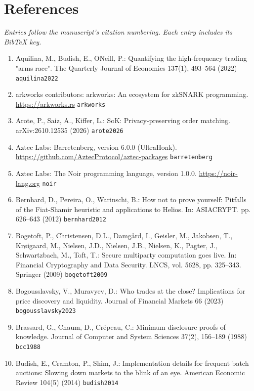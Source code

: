 
\section{References}

\emph{Entries follow the manuscript's citation numbering. Each entry includes its BibTeX key.}

\begin{enumerate}
\def\labelenumi{\arabic{enumi}.}
\item
  Aquilina, M., Budish, E., O\textquotesingle Neill, P.: Quantifying the high-frequency trading "arms race". The Quarterly Journal of Economics 137(1), 493--564 (2022) \texttt{aquilina2022}
\item
  arkworks contributors: arkworks: An ecosystem for zkSNARK programming. \url{https://arkworks.rs} \texttt{arkworks}
\item
  Arote, P., Saiz, A., Kiffer, L.: SoK: Privacy-preserving order matching. arXiv:2610.12535 (2026) \texttt{arote2026}
\item
  Aztec Labs: Barretenberg, version 6.0.0 (UltraHonk). \url{https://github.com/AztecProtocol/aztec-packages} \texttt{barretenberg}
\item
  Aztec Labs: The Noir programming language, version 1.0.0. \url{https://noir-lang.org} \texttt{noir}
\item
  Bernhard, D., Pereira, O., Warinschi, B.: How not to prove yourself: Pitfalls of the Fiat-Shamir heuristic and applications to Helios. In: ASIACRYPT. pp. 626--643 (2012) \texttt{bernhard2012}
\item
  Bogetoft, P., Christensen, D.L., Damgård, I., Geisler, M., Jakobsen, T., Krøigaard, M., Nielsen, J.D., Nielsen, J.B., Nielsen, K., Pagter, J., Schwartzbach, M., Toft, T.: Secure multiparty computation goes live. In: Financial Cryptography and Data Security. LNCS, vol. 5628, pp. 325--343. Springer (2009) \texttt{bogetoft2009}
\item
  Bogousslavsky, V., Muravyev, D.: Who trades at the close? Implications for price discovery and liquidity. Journal of Financial Markets 66 (2023) \texttt{bogousslavsky2023}
\item
  Brassard, G., Chaum, D., Crépeau, C.: Minimum disclosure proofs of knowledge. Journal of Computer and System Sciences 37(2), 156--189 (1988) \texttt{bcc1988}
\item
  Budish, E., Cramton, P., Shim, J.: Implementation details for frequent batch auctions: Slowing down markets to the blink of an eye. American Economic Review 104(5) (2014) \texttt{budish2014}

\end{enumerate}
